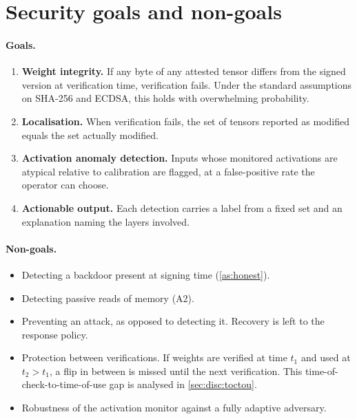 \section{Security goals and non-goals}
\label{sec:tm:goals}

\paragraph{Goals.}
\begin{enumerate}[label=G\arabic*,leftmargin=*]
  \item \textbf{Weight integrity.} If any byte of any attested tensor differs from the signed
        version at verification time, verification fails. Under the standard assumptions on
        SHA-256 and ECDSA, this holds with overwhelming probability.
  \item \textbf{Localisation.} When verification fails, the set of tensors reported as modified
        equals the set actually modified.
  \item \textbf{Activation anomaly detection.} Inputs whose monitored activations are atypical
        relative to calibration are flagged, at a false-positive rate the operator can choose.
  \item \textbf{Actionable output.} Each detection carries a label from a fixed set and an
        explanation naming the layers involved.
\end{enumerate}

\paragraph{Non-goals.}
\begin{itemize}[leftmargin=*]
  \item Detecting a backdoor present at signing time (\cref{as:honest}).
  \item Detecting passive reads of memory (A2).
  \item Preventing an attack, as opposed to detecting it. Recovery is left to the response policy.
  \item Protection between verifications. If weights are verified at time $t_1$ and used at
        $t_2>t_1$, a flip in between is missed until the next verification. This
        time-of-check-to-time-of-use gap is analysed in \cref{sec:disc:toctou}.
  \item Robustness of the activation monitor against a fully adaptive adversary.
\end{itemize}
